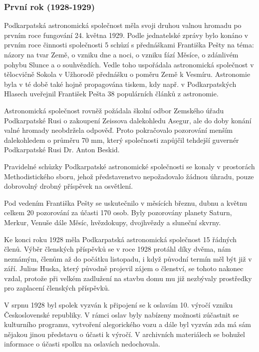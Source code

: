 \documentclass[10pt,a5paper,twoside]{book}
\begin{document}
\subsubsection*{První rok (1928-1929)}
\par Podkarpatská astronomická společnost měla svoji druhou valnou hromadu po prvním roce fungování 24. května 1929. Podle jednatelské zprávy bylo konáno v prvním roce činnosti společnosti 5 schůzí s přednáškami Františka Pešty na téma: názory na tvar Země, o vzniku dne a noci, o vzniku fází Měsíce, o zdánlivém pohybu Slunce a o souhvězdích. Vedle toho uspořádala astronomická společnost v tělocvičně Sokola v Užhorodě přednášku o poměru Země k Vesmíru. Astronomie byla v té době také hojně propagována tiskem, kdy např. v Podkarpatských Hlasech uveřejnil František Pešta 38 populárních článků z astronomie. 
\par Astronomická společnost rovněž požádala školní odbor Zemského úřadu Podkarpatské Rusi o zakoupení Zeissova dalekohledu Asegur, ale do doby konání valné hromady neobdržela odpověď. Proto pokračovalo pozorování menším dalekohledem o průměru 70 mm, který společnosti zapůjčil tehdejší guvernér Podkarpatské Rusi Dr. Anton Beskid. 
\par Pravidelné schůzky Podkarpatské astronomické společnosti se konaly v prostorách Methodistického sboru, jehož představenstvo nepožadovalo žádnou úhradu, pouze dobrovolný drobný příspěvek na osvětlení.
\par Pod vedením Františka Pešty se uskutečnilo v měsících březnu, dubnu a květnu celkem 20 pozorování za účasti 170 osob. Byly pozorovány planety Saturn, Merkur, Venuše dále Měsíc, hvězdokupy, dvojhvězdy a sluneční skvrny. 
\par Ke konci roku 1928 měla Podkarpatská astronomická společnost 15 řádných členů. Výběr členských příspěvků se v roce 1928 protáhl díky dvěma, nám neznámým, členům až do počátku listopadu, i když původní termín měl být již v září. Julius Huska, který původně projevil zájem o členství, se tohoto nakonec vzdal, protože při velkém zadlužení na stavbu domu mu již nezbývaly prostředky pro zaplacení členských příspěvků. 
\par V srpnu 1928 byl spolek vyzván k připojení se k oslavám 10. výročí vzniku Československé republiky. V rámci oslav byly nabízeny možnosti zúčastnit se kulturního programu, vytvoření alegorického vozu a dále byl vyzván zda má sám nějakou jinou představu o účasti k výročí. V archivních materiálech se bohužel informace o účasti spolku na oslavách nedochovala.
\end{document}
